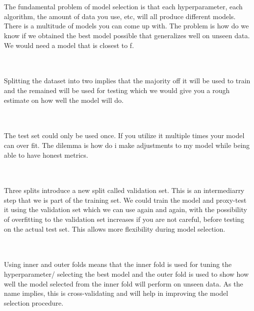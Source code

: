 \documentclass[12pt]{article}
\begin{document}
\begin{enumerate}

 \\ \\ 
The fundamental problem of model selection is that each hyperparameter, each algorithm, the amount of data you use, etc, will all produce different models. There is a multitude of models you can come up with. The problem is how do we know if we obtained the best model possible that generalizes well on unseen data. We would need a model that is closest to f.

 \\\\
Splitting the dataset into two implies that the majority off it will be used to train and the remained will be used for testing which we would give you a rough estimate on how well the model will do. 

 \\ \\ 
The test set could only be used once. If you utilize it multiple times your model can over fit. The dilemma is how do i make adjustments to my model while being able to have honest metrics. 

 \\ \\ 
Three splits introduce a new split called validation set. This is an intermediarry step that we is part of the training set. We could train the model and proxy-test it using the validation set which we can use again and again, with the possibility of overfitting to the validation set increases if you are not careful, before testing on the actual test set. This allows more flexibility during model selection. 

 \\ \\ 
Using inner and outer folds means that the inner fold is used for tuning the hyperparameter/ selecting the best model and the outer fold is used to show how well the
model selected from the inner fold will perform on unseen data. As the name implies,
this is cross-validating and will help in improving the model selection procedure.


\end{enumerate}
\end{document}
